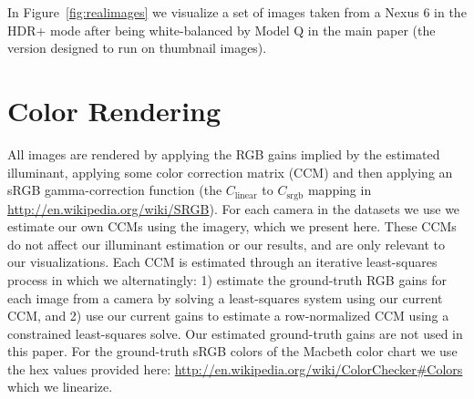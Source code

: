 \documentclass[10pt,twocolumn,letterpaper]{article}
\begin{document}
In Figure~\ref{fig:realimages} we visualize a set of images taken from a Nexus
6 in the HDR+ mode \cite{Hasinoff2016} after being white-balanced by
Model Q in the main paper (the version designed to run on thumbnail images).


\section{Color Rendering}

All images are rendered by
applying the RGB gains implied by the estimated illuminant, applying some
color correction matrix (CCM)
and then applying an sRGB gamma-correction function (the
$C_{\mathrm{linear}}$ to $C_{\mathrm {srgb}}$ mapping in
\url{http://en.wikipedia.org/wiki/SRGB}).
For each camera in the datasets we use we estimate our own CCMs using the imagery,
which we present here.
These CCMs do not affect our illuminant estimation or our results,
and are only relevant to our visualizations.
Each CCM is estimated through an iterative least-squares process in which
we alternatingly:
1) estimate the ground-truth RGB gains for each image from a camera
by solving a least-squares system using our current CCM, and
2) use our current gains to estimate a row-normalized CCM using a constrained
least-squares solve.
Our estimated ground-truth gains are not used in this paper.
For the ground-truth sRGB colors of the Macbeth color chart we use the hex values
provided here: \url{http://en.wikipedia.org/wiki/ColorChecker#Colors}
which we linearize.


\end{document}
